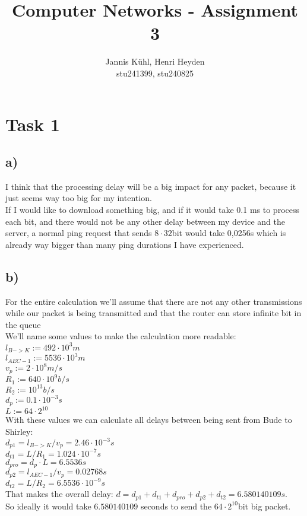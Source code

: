 \documentclass[12pt, a4paper]{article}
\title{Computer Networks - Assignment 3}
\author{Jannis Kühl, Henri Heyden\\ \small stu241399, stu240825}
\date{}
\begin{document}
\maketitle

\section*{Task 1}
\subsection*{a)}
I think that the processing delay will be a big impact for any packet, because it just seems way too big for my intention. \\
If I would like to download something big, and if it would take 0.1 ms to process each bit, and there would not be any other delay between my device and the server, a normal ping request that sends \(8 \cdot 32\)bit would take 0,0256s which is already way bigger than many ping durations I have experienced.
\subsection*{b)}
For the entire calculation we'll assume that there are not any other transmissions while our packet is being transmitted and that the router can store infinite bit in the queue\\
We'll name some values to make the calculation more readable:\\
\(l_{B->K} := 492 \cdot 10^3m\) \\
\(l_{AEC-1} := 5536 \cdot 10^3m\) \\
\(v_p := 2 \cdot 10^8m/s\) \\
\(R_1 := 640 \cdot 10^9b/s\) \\
\(R_2 := 10^{13}b/s\) \\
\(d_p := 0.1 \cdot 10^{-3}s\) \\
\(L := 64 \cdot 2^{10}\) \\
With these values we can calculate all delays between being sent from Bude to Shirley:\\
\(d_{p1} = l_{B->K} / v_p = 2.46 \cdot 10^{-3}s\) \\
\(d_{t1} = L / R_1 = 1.024 \cdot 10^{-7}s\) \\
\(d_{pro} = d_p \cdot L = 6.5536s\) \\
\(d_{p2} = l_{AEC-1} / v_p = 0.02768s\) \\
\(d_{t2} = L / R_2 = 6.5536 \cdot 10^{-9}s\) \\
That makes the overall delay: \(d = d_{p1} + d_{t1} + d_{pro} + d_{p2} + d_{t2} = 6.580140109s\).\\
So ideally it would take \(6.580140109\) seconds to send the \(64 \cdot 2^{10}\)bit big packet.
\end{document}
